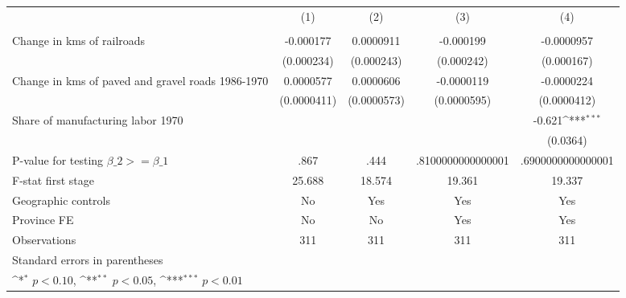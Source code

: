 {
\def\sym#1{\ifmmode^{#1}\else\(^{#1}\)\fi}
\begin{tabular}{l*{4}{c}}
\hline\hline
                &\multicolumn{1}{c}{(1)}&\multicolumn{1}{c}{(2)}&\multicolumn{1}{c}{(3)}&\multicolumn{1}{c}{(4)}\\
                &\multicolumn{1}{c}{}&\multicolumn{1}{c}{}&\multicolumn{1}{c}{}&\multicolumn{1}{c}{}\\
\hline
Change in kms of railroads&-0.000177         &0.0000911         &-0.000199         &-0.0000957         \\
                &(0.000234)         &(0.000243)         &(0.000242)         &(0.000167)         \\
[1em]
Change in kms of paved and gravel roads 1986-1970&0.0000577         &0.0000606         &-0.0000119         &-0.0000224         \\
                &(0.0000411)         &(0.0000573)         &(0.0000595)         &(0.0000412)         \\
[1em]
Share of manufacturing labor 1970&                  &                  &                  &   -0.621\sym{***}\\
                &                  &                  &                  & (0.0364)         \\
\hline
P-value for testing $\beta\_{2} >= \beta\_{1}$&     .867         &     .444         &.8100000000000001         &.6900000000000001         \\
F-stat first stage&   25.688         &   18.574         &   19.361         &   19.337         \\
Geographic controls&       No         &      Yes         &      Yes         &      Yes         \\
Province FE     &       No         &       No         &      Yes         &      Yes         \\
Observations    &      311         &      311         &      311         &      311         \\
\hline\hline
\multicolumn{5}{l}{\footnotesize Standard errors in parentheses}\\
\multicolumn{5}{l}{\footnotesize \sym{*} \(p<0.10\), \sym{**} \(p<0.05\), \sym{***} \(p<0.01\)}\\
\end{tabular}
}
